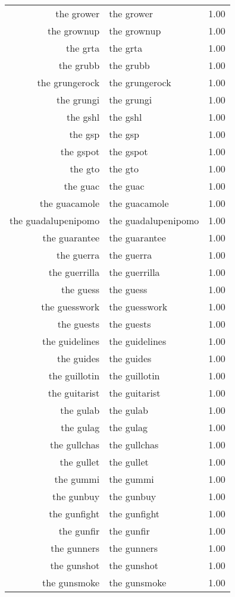 \begin{table}[ht]
\begin{tabular}{rlr}
  the grower & the grower & 1.00 \\ 
  the grownup & the grownup & 1.00 \\ 
  the grta & the grta & 1.00 \\ 
  the grubb & the grubb & 1.00 \\ 
  the grungerock & the grungerock & 1.00 \\ 
  the grungi & the grungi & 1.00 \\ 
  the gshl & the gshl & 1.00 \\ 
  the gsp & the gsp & 1.00 \\ 
  the gspot & the gspot & 1.00 \\ 
  the gto & the gto & 1.00 \\ 
  the guac & the guac & 1.00 \\ 
  the guacamole & the guacamole & 1.00 \\ 
  the guadalupenipomo & the guadalupenipomo & 1.00 \\ 
  the guarantee & the guarantee & 1.00 \\ 
  the guerra & the guerra & 1.00 \\ 
  the guerrilla & the guerrilla & 1.00 \\ 
  the guess & the guess & 1.00 \\ 
  the guesswork & the guesswork & 1.00 \\ 
  the guests & the guests & 1.00 \\ 
  the guidelines & the guidelines & 1.00 \\ 
  the guides & the guides & 1.00 \\ 
  the guillotin & the guillotin & 1.00 \\ 
  the guitarist & the guitarist & 1.00 \\ 
  the gulab & the gulab & 1.00 \\ 
  the gulag & the gulag & 1.00 \\ 
  the gullchas & the gullchas & 1.00 \\ 
  the gullet & the gullet & 1.00 \\ 
  the gummi & the gummi & 1.00 \\ 
  the gunbuy & the gunbuy & 1.00 \\ 
  the gunfight & the gunfight & 1.00 \\ 
  the gunfir & the gunfir & 1.00 \\ 
  the gunners & the gunners & 1.00 \\ 
  the gunshot & the gunshot & 1.00 \\ 
  the gunsmoke & the gunsmoke & 1.00 \\ 

\end{tabular}
\end{table}
